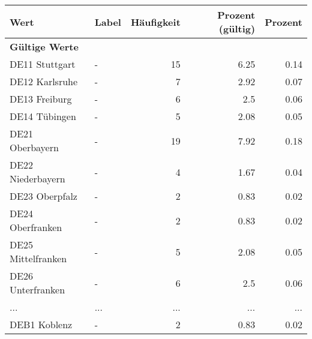      \begin{longtable}{Xlrrr}
     \toprule
     \textbf{Wert} & \textbf{Label} & \textbf{Häufigkeit} & \textbf{Prozent (gültig)} & \textbf{Prozent} \\
     \endhead
     \midrule
     \multicolumn{5}{l}{\textbf{Gültige Werte}}\\
        \multicolumn{1}{X}{DE11 Stuttgart} & - & \num{15} & \num[round-mode=places,round-precision=2]{6.25} & \num[round-mode=places,round-precision=2]{0.14} \\
        \multicolumn{1}{X}{DE12 Karlsruhe} & - & \num{7} & \num[round-mode=places,round-precision=2]{2.92} & \num[round-mode=places,round-precision=2]{0.07} \\
        \multicolumn{1}{X}{DE13 Freiburg} & - & \num{6} & \num[round-mode=places,round-precision=2]{2.5} & \num[round-mode=places,round-precision=2]{0.06} \\
        \multicolumn{1}{X}{DE14 Tübingen} & - & \num{5} & \num[round-mode=places,round-precision=2]{2.08} & \num[round-mode=places,round-precision=2]{0.05} \\
        \multicolumn{1}{X}{DE21 Oberbayern} & - & \num{19} & \num[round-mode=places,round-precision=2]{7.92} & \num[round-mode=places,round-precision=2]{0.18} \\
        \multicolumn{1}{X}{DE22 Niederbayern} & - & \num{4} & \num[round-mode=places,round-precision=2]{1.67} & \num[round-mode=places,round-precision=2]{0.04} \\
        \multicolumn{1}{X}{DE23 Oberpfalz} & - & \num{2} & \num[round-mode=places,round-precision=2]{0.83} & \num[round-mode=places,round-precision=2]{0.02} \\
        \multicolumn{1}{X}{DE24 Oberfranken} & - & \num{2} & \num[round-mode=places,round-precision=2]{0.83} & \num[round-mode=places,round-precision=2]{0.02} \\
        \multicolumn{1}{X}{DE25 Mittelfranken} & - & \num{5} & \num[round-mode=places,round-precision=2]{2.08} & \num[round-mode=places,round-precision=2]{0.05} \\
        \multicolumn{1}{X}{DE26 Unterfranken} & - & \num{6} & \num[round-mode=places,round-precision=2]{2.5} & \num[round-mode=places,round-precision=2]{0.06} \\
       ... & ... & ... & ... & ... \\
        \multicolumn{1}{X}{DEB1 Koblenz} & - & \num{2} & \num[round-mode=places,round-precision=2]{0.83} & \num[round-mode=places,round-precision=2]{0.02} \\

\end{longtable}
